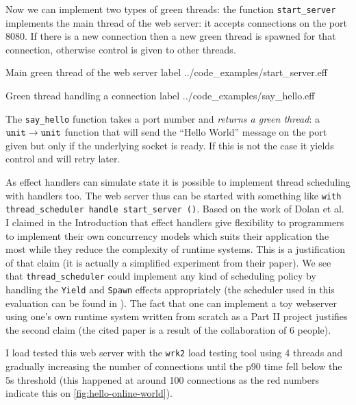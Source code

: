 \documentclass[class=article, crop=false]{standalone}
\begin{document}
Now we can implement two types of green threads: the function
\lstinline|start_server| implements the main thread of the web server: it
accepts connections on the port 8080. If there is a new connection then a new
green thread is spawned for that connection, otherwise control is given to other
threads.

{Main green thread of the web server}
{label}
{../code_examples/start_server.eff}

{Green thread handling a connection}
{label}
{../code_examples/say_hello.eff}

The \lstinline{say_hello} function takes a port number and
\emph{returns a green thread}: a $\mathtt{unit} \to \mathtt{unit}$ function that will
send the ``Hello World'' message on the port given but only if the underlying
socket is ready. If this is not the case it yields control and will retry later.


As effect handlers can simulate state it is possible to implement thread
scheduling with handlers too. The web server thus can be started with something
like \lstinline{with thread_scheduler handle start_server ()}.
%
Based on the work of Dolan et al.\ \cite{dolan2017concurrent} I claimed in
the Introduction that effect handlers give flexibility to programmers to
implement their own concurrency models which suits their application the most
while they reduce the complexity of runtime systems. This is a justification of
that claim (it is actually a simplified experiment from their paper). We see
that \lstinline|thread_scheduler| could implement any kind of scheduling policy by
handling the \lstinline|Yield| and \lstinline|Spawn| effects appropriately
(the scheduler used in this evaluation can be found in \cite{eff-website}). The fact that
one can implement a toy webserver using one's own runtime system written from
scratch as a Part II project justifies the second claim (the cited paper is a
result of the collaboration of 6 people).

I load tested this web server with the \lstinline|wrk2| load testing tool
\cite{wrk2-website} using 4 threads and gradually increasing the number of
connections until the p90 time fell below the 5s threshold (this happened at
around 100 connections as the red numbers indicate this on
\autoref{fig:hello-online-world}).
\end{document}
